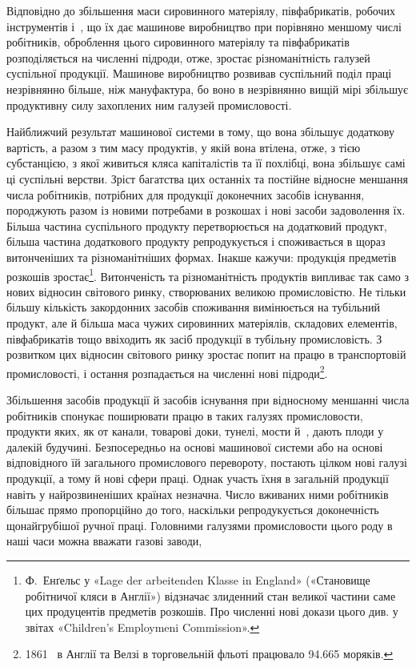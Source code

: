 
Відповідно до збільшення маси сировинного матеріялу, півфабрикатів,
робочих інструментів і~, що їх дає машинове
виробництво при порівняно меншому числі робітників,
оброблення цього сировинного матеріялу та півфабрикатів розподіляється
на численні підроди, отже, зростає різноманітність
галузей суспільної продукції. Машинове виробництво розвивав
суспільний поділ праці незрівнянно більше, ніж мануфактура,
бо воно в незрівнянно вищій мірі збільшує продуктивну силу
захоплених ним галузей промисловості.

Найближчий результат машинової системи в тому, що вона
збільшує додаткову вартість, а разом з тим масу продуктів, у
якій вона втілена, отже, з тією субстанцією, з якої живиться
кляса капіталістів та її похлібці, вона збільшує самі ці суспільні
верстви. Зріст багатства цих останніх та постійне відносне меншання
числа робітників, потрібних для продукції доконечних
засобів існування, породжують разом із новими потребами в розкошах
і нові засоби задоволення їх. Більша частина суспільного
продукту перетворюється на додатковий продукт, більша частина
додаткового продукту репродукується і споживається в щораз
витонченіших та різноманітніших формах. Інакше кажучи: продукція
предметів розкошів зростає\footnote{
Ф.~Енґельс у «Lage der arbeitenden Klasse in England» («Становище
робітничої кляси в Англії») відзначає злиденний стан великої частини
саме цих продуцентів предметів розкошів. Про численні нові докази
цього див. у звітах «Children’s Employmeni Commission».
}. Витонченість та різноманітність
продуктів випливає так само з нових відносин світового
ринку, створюваних великою промисловістю. Не тільки
більшу кількість закордонних засобів споживання вимінюється
на тубільний продукт, але й більша маса чужих сировинних матеріялів,
складових елементів, півфабрикатів тощо ввіходить
як засіб продукції в тубільну промисловість. З розвитком цих
відносин світового ринку зростає попит на працю в транспортовій
промисловості, і остання розпадається на численні нові
підроди\footnote{
1861~ в Англії та Велзі в торговельній фльоті працювало \num{94.665}
моряків.
}.

Збільшення засобів продукції й засобів існування при відносному
меншанні числа робітників спонукає поширювати працю в
таких галузях промисловости, продукти яких, як от канали,
товарові доки, тунелі, мости й~, дають плоди у далекій будучині.
Безпосередньо на основі машинової системи або на основі
відповідного їй загального промислового перевороту, постають
цілком нові галузі продукції, а тому й нові сфери праці. Однак
участь їхня в загальній продукції навіть у найрозвиненіших
країнах незначна. Число вживаних ними робітників більшає
прямо пропорційно до того, наскільки репродукується доконечність
щонайгрубішої ручної праці. Головними галузями промисловости
цього роду в наші часи можна вважати газові заводи,
\parbreak{}  %
